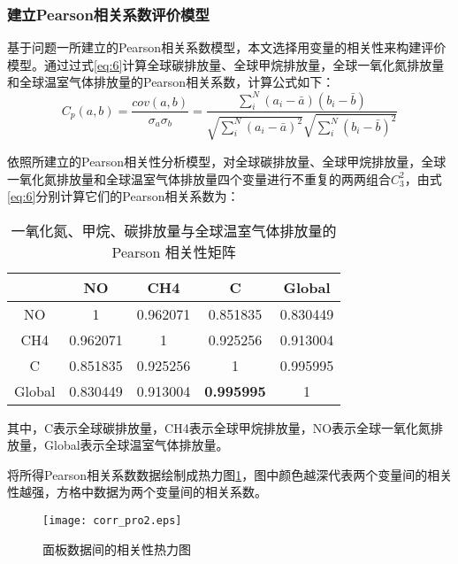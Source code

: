 \documentclass[withoutpreface,bwprint]{cumcmthesis}
\begin{document}
\subsubsection{建立Pearson相关系数评价模型}
	    基于问题一所建立的Pearson相关系数模型，本文选择用变量的相关性来构建评价模型。通过过式\eqref{eq:6}计算全球碳排放量、全球甲烷排放量，全球一氧化氮排放量和全球温室气体排放量的Pearson相关系数，计算公式如下：
	   \begin{equation}
	   	\label{eq:6}
	   	{{C}_{p}}(a,b)=\frac{cov(a,b)}{{{\sigma }_{a}}{{\sigma }_{b}}}=\frac{\sum_{i}^{N}{({{a}_{i}}-\bar{a})({{b}_{i}}-\bar{b})}}{\sqrt{\sum_{i}^{N}{{{({{a}_{i}}-\bar{a})}^{2}}}}\sqrt{\sum_{i}^{N}{{{({{b}_{i}}-\bar{b})}^{2}}}}}
	   \end{equation}
	   
	   
	   	依照所建立的Pearson相关性分析模型，对全球碳排放量、全球甲烷排放量，全球一氧化氮排放量和全球温室气体排放量四个变量进行不重复的两两组合$C_3^2$，由式\eqref{eq:6}分别计算它们的Pearson相关系数为：
	   
	   \begin{table}[htbp]
	   	\centering
	   	\caption{一氧化氮、甲烷、碳排放量与全球温室气体排放量的 Pearson 相关性矩阵}
	   	\begin{tabular}{c|cccc} 
	   		\hline
	   		& NO       & CH4      & C                 & Global    \\ 
	   		\hline
	   		NO     & 1        & 0.962071 & 0.851835          & 0.830449  \\
	   		CH4    & 0.962071 & 1        & 0.925256          & 0.913004  \\
	   		C      & 0.851835 & 0.925256 & 1                 & 0.995995  \\
	   		Global & 0.830449 & 0.913004 & \textbf{0.995995} & 1         \\
	   		\hline
	   	\end{tabular}
	   \end{table}
	   
	   
	   其中，C表示全球碳排放量，CH4表示全球甲烷排放量，NO表示全球一氧化氮排放量，Global表示全球温室气体排放量。
	   
	   将所得Pearson相关系数数据绘制成热力图\ref{fig:corrpro2}，图中颜色越深代表两个变量间的相关性越强，方格中数据为两个变量间的相关系数。
	   
	   \begin{figure}[htbp]
	   	\centering
	   	\texttt{[image: corr\_pro2.eps]}
	   	\caption{面板数据间的相关性热力图}
	   	\label{fig:corrpro2}
	   \end{figure}
	   
\end{document}
